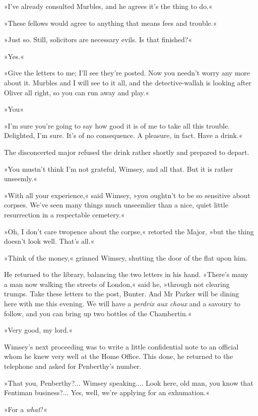 »I've already consulted Murbles, and he agrees it's the thing to do.«

»These fellows would agree to anything that means fees and trouble.«

»Just so. Still, solicitors are necessary evils. Is that finished?«

»Yes.«

»Give the letters to me; I'll see they're posted. Now you needn't worry any more about it. Murbles and I will see to it all, and the detective-wallah is looking after Oliver all right, so you can run away and play.«

»You\longdash«

»I'm sure you're going to say how good it is of me to take all this trouble. Delighted, I'm sure. It's of no consequence. A pleasure, in fact. Have a drink.«

The disconcerted major refused the drink rather shortly and prepared to depart.

»You mustn't think I'm not grateful, Wimsey, and all that. But it is rather unseemly.«

»With all your experience,« said Wimsey, »you oughtn't to be so sensitive about corpses. We've seen many things much unseemlier than a nice, quiet little resurrection in a respectable cemetery.«

»Oh, I don't care twopence about the corpse,« retorted the Major, »but the thing doesn't look well. That's all.«

»Think of the money,« grinned Wimsey, shutting the door of the flat upon him.

He returned to the library, balancing the two letters in his hand. »There's many a man now walking the streets of London,« said he, »through not clearing trumps. Take these letters to the post, Bunter. And Mr Parker will be dining here with me this evening. We will have a \textit{perdrix aux choux} and a savoury to follow, and you can bring up two bottles of the Chambertin.«

»Very good, my lord.«

Wimsey's next proceeding was to write a little confidential note to an official whom he knew very well at the Home Office. This done, he returned to the telephone and asked for Penberthy's number.

»That you, Penberthy?... Wimsey speaking.... Look here, old man, you know that Fentiman business?... Yes, well, we're applying for an exhumation.«

»For a \textit{what}?«

